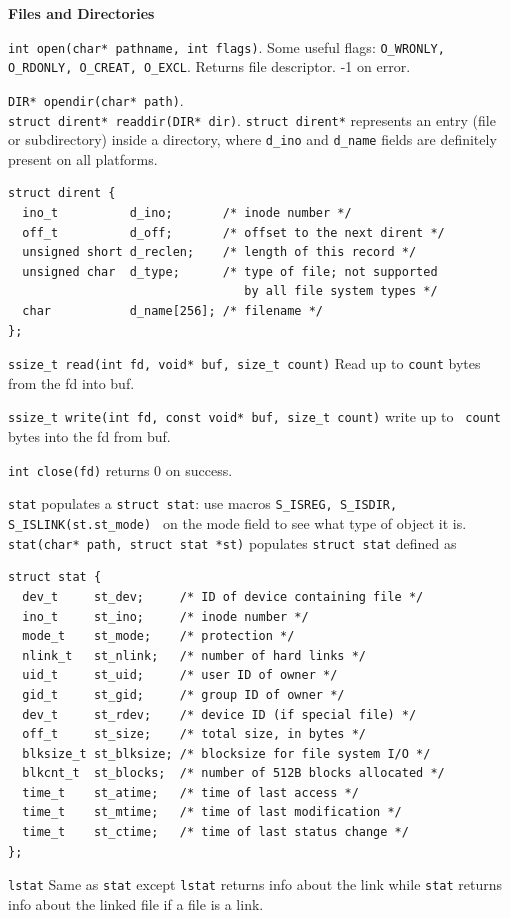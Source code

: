 \documentclass{article}
\begin{document}
\small
\begin{multicols}{2}
  \raggedright
  {\bf Files and Directories}

  {\tt int open(char* pathname, int flags)}. Some useful flags:
  {\tt O\_WRONLY, O\_RDONLY, O\_CREAT, O\_EXCL}. Returns file descriptor. -1 on
  error.

  {\tt DIR* opendir(char* path)}.\\
  {\tt struct dirent* readdir(DIR* dir)}. \texttt{struct dirent*} represents an
  entry (file or subdirectory) inside a directory, where \texttt{d\_ino} and
  \texttt{d\_name} fields are definitely present on all platforms.
  {\footnotesize
  \begin{verbatim}
struct dirent {
  ino_t          d_ino;       /* inode number */
  off_t          d_off;       /* offset to the next dirent */
  unsigned short d_reclen;    /* length of this record */
  unsigned char  d_type;      /* type of file; not supported
                                 by all file system types */
  char           d_name[256]; /* filename */
};\end{verbatim}}
  {\tt ssize\_t read(int fd, void* buf, size\_t count)} Read up to {\tt count}
  bytes from the fd into buf.

  {\tt ssize\_t write(int fd, const void* buf, size\_t count)} write up to {\tt
  count} bytes into the fd from buf.

  {\tt int close(fd)} returns 0 on success.

  {\tt stat} populates a {\tt struct stat}: use macros
  {\tt S\_ISREG, S\_ISDIR, S\_ISLINK(st.st\_mode) } on the mode field to see
  what type of object it is.
  {\tt stat(char* path, struct stat *st)} populates \texttt{struct stat} defined
  as
  {\footnotesize
  \begin{verbatim}
struct stat {
  dev_t     st_dev;     /* ID of device containing file */
  ino_t     st_ino;     /* inode number */
  mode_t    st_mode;    /* protection */
  nlink_t   st_nlink;   /* number of hard links */
  uid_t     st_uid;     /* user ID of owner */
  gid_t     st_gid;     /* group ID of owner */
  dev_t     st_rdev;    /* device ID (if special file) */
  off_t     st_size;    /* total size, in bytes */
  blksize_t st_blksize; /* blocksize for file system I/O */
  blkcnt_t  st_blocks;  /* number of 512B blocks allocated */
  time_t    st_atime;   /* time of last access */
  time_t    st_mtime;   /* time of last modification */
  time_t    st_ctime;   /* time of last status change */
}; \end{verbatim}}
  {\tt lstat} Same as {\tt stat} except {\tt lstat} returns info about the
  link while {\tt stat} returns info about the linked file if a file is a link.


\end{multicols}
\end{document}
